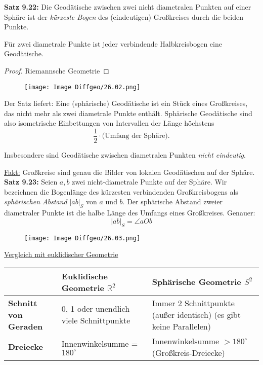 \documentclass[fleqn, 12pt, letterpaper]{article}
\begin{document}
\medskip

\textbf{Satz 9.22:}  
Die Geodätische zwischen zwei nicht diametralen Punkten auf einer Sphäre ist der \emph{kürzeste Bogen} des (eindeutigen) Großkreises durch die beiden Punkte.

Für zwei diametrale Punkte ist jeder verbindende Halbkreis­bogen eine Geodätische.
\begin{proof}
    Riemannsche Geometrie
\end{proof}
      \begin{figure}[H]
    \centering
    \texttt{[image: Image Diffgeo/26.02.png]}
 \end{figure}
Der Satz liefert: Eine (sphärische) Geodätische ist ein Stück eines Großkreises, das nicht mehr als zwei diametrale Punkte enthält. Sphärische Geodätische sind also isometrische Einbettungen von Intervallen der Länge höchstens
\[
\frac{1}{2} \cdot \text{(Umfang der Sphäre)}.
\]

Insbesondere sind Geodätische zwischen diametralen Punkten \emph{nicht eindeutig}.

\medskip

\underline{Fakt:} Großkreise sind genau die Bilder von lokalen Geodätischen auf der Sphäre.\\

\textbf{Satz 9.23:}  
Seien \( a, b \) zwei nicht-diametrale Punkte auf der Sphäre. Wir bezeichnen die Bogenlänge des kürzesten verbindenden Großkreisbogens als \emph{sphärischen Abstand} \( |ab|_{S} \) von \( a \) und \( b \). Der sphärische Abstand zweier diametraler Punkte ist die halbe Länge des Umfangs eines Großkreises. Genauer:
\[
|ab|_{S} = \angle aOb
\]
       \begin{figure}[H]
    \centering
    \texttt{[image: Image Diffgeo/26.03.png]}
 \end{figure}
 
\underline{Vergleich mit euklidischer Geometrie}\\

\begin{tabular}{>{\bfseries}m{4cm}|m{5cm}|m{5cm}}
 & Euklidische Geometrie \( \mathbb{R}^2 \) & Sphärische Geometrie \( S^2 \) \\
\hline
{Schnitt von Geraden} &
0, 1 oder unendlich viele Schnittpunkte &
Immer 2 Schnittpunkte (außer identisch) \newline (es gibt keine Parallelen) \\
\hline
{Dreiecke} &
Innenwinkelsumme = \( 180^\circ \) &
Innenwinkelsumme \( > 180^\circ \) \newline (Großkreis-Dreiecke) \\
\end{tabular}
\end{document}
